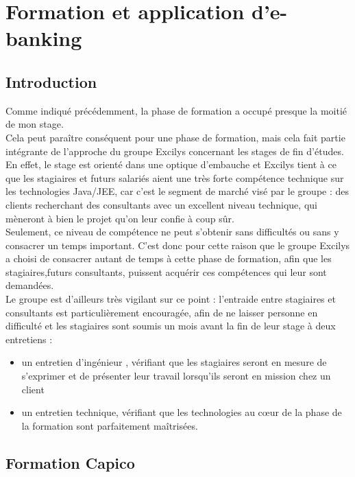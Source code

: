 \section{Formation et application d'e-banking}

\subsection{Introduction}

Comme indiqué précédemment, la phase de formation a occupé presque la moitié de mon stage.\\
Cela peut paraître conséquent pour une phase de formation, mais cela fait partie intégrante de l'approche du groupe Excilys concernant les stages de fin d'études.\\

En effet, le stage est orienté dans une optique d'embauche et Excilys tient à ce que les stagiaires et futurs salariés aient une très forte compétence technique sur les technologies Java/JEE, car c'est le segment de marché visé par le groupe :  des clients recherchant des consultants avec  un excellent niveau technique, qui mèneront à bien le projet qu'on leur confie à coup sûr.\\

Seulement, ce niveau de compétence ne peut s'obtenir sans difficultés ou sans y consacrer un temps important. C'est donc pour cette raison que le groupe Excilys a choisi de consacrer autant de temps à cette phase de formation, afin que les stagiaires,futurs consultants, puissent acquérir ces compétences qui leur sont demandées.\\
Le groupe est d'ailleurs très vigilant sur ce point : l'entraide entre stagiaires et consultants est particulièrement encouragée, afin de ne laisser personne en difficulté et les stagiaires sont soumis un mois avant la fin de leur stage à deux entretiens :
\begin{itemize}
	\item un entretien \og d'ingénieur \fg{}, vérifiant que les stagiaires seront en mesure de s'exprimer et de présenter leur travail lorsqu'ils seront en mission chez un client
	\item un entretien technique, vérifiant que les technologies au cœur de la phase de la formation sont parfaitement maîtrisées.  
\end{itemize}

\subsection{Formation Capico}

